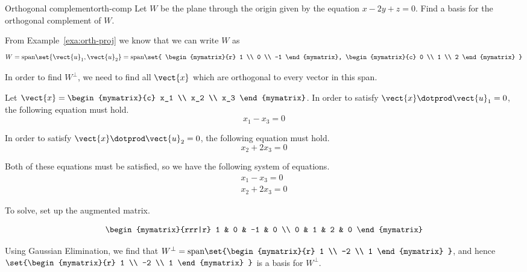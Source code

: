 \begin{example}{Orthogonal complement}{orth-comp}
Let $W$ be the  plane through the origin given by the equation  $x - 2y + z = 0$. Find
a basis for the orthogonal complement of $W$.
\end{example}

\begin{solution}

From Example~\ref{exa:orth-proj} we know that we can write $W$ as 
\[
W = \mbox{span} \set{\vect{u}_1, \vect{u}_2 } = \mbox{span} 
\set{
\begin{mymatrix}{r}
1 \\
0 \\
-1
\end{mymatrix},
\begin{mymatrix}{c}
0 \\
1 \\
2
\end{mymatrix}
}
\]

In order to find $W^{\perp}$, we need to find all $\vect{x}$ which are orthogonal to every vector in this span. 

Let $\vect{x} = \begin{mymatrix}{c}
x_1 \\
x_2 \\
x_3
\end{mymatrix}$. 
In order to satisfy $\vect{x} \dotprod \vect{u}_1 = 0$, the following equation must hold. 
\[
x_1 - x_3 = 0
\]

In order to satisfy $\vect{x} \dotprod \vect{u}_2 = 0$, the following equation must hold.
\[
x_2 + 2x_3 = 0 
\]

Both of these equations must be satisfied, so we have the following system of equations. 
\[
\begin{array}{c}
x_1 - x_3 = 0 \\
x_2 + 2x_3 = 0
\end{array}
\]

To solve, set up the augmented matrix. 

\[
\begin{mymatrix}{rrr|r}
1 & 0 & -1 & 0 \\
0 & 1 & 2 & 0 
\end{mymatrix}
\]

Using Gaussian Elimination, we find that $W^{\perp} = \mbox{span} \set{\begin{mymatrix}{r}
1 \\
-2 \\
1
\end{mymatrix}
}$, and hence 
$\set{\begin{mymatrix}{r}
1 \\
-2 \\
1
\end{mymatrix}
}$ is a basis for  $W^{\perp}$. 
\end{solution}

